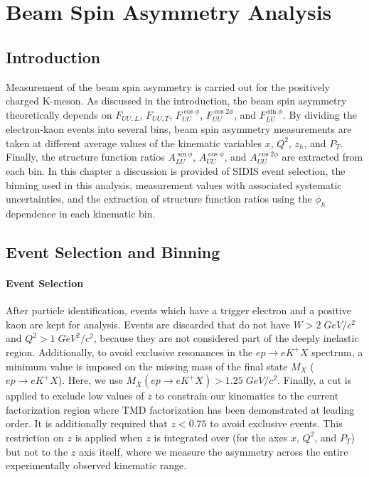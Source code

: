 \chapter{Beam Spin Asymmetry Analysis}

\section{Introduction}
Measurement of the beam spin asymmetry is carried out for the positively charged K-meson.  As discussed in the introduction, the beam spin asymmetry theoretically depends on $F_{UU,L}$, $F_{UU,T}$, $F_{UU}^{\cos\phi}$, $F_{UU}^{\cos 2\phi}$, and $F_{LU}^{\sin\phi}$.  By dividing the electron-kaon events into several bins, beam spin asymmetry measurements are taken at different average values of the kinematic variables $x$, $Q^2$, $z_h$, and $P_T$.  Finally, the structure function ratios $A_{LU}^{\sin\phi}$, $A_{UU}^{\cos\phi}$, and $A_{UU}^{\cos 2\phi}$ are extracted from each bin.  In this chapter a discussion is provided of SIDIS event selection, the binning used in this analysis, measurement values with associated systematic uncertainties, and the extraction of structure function ratios using the $\phi_h$ dependence in each kinematic bin.

\section{Event Selection and Binning}
\subsubsection*{Event Selection}
After particle identification, events which have a trigger electron and a positive kaon are kept for analysis.  Events are discarded that do not have $W > 2 \; GeV/c^2$ and $Q^2 > 1 \; GeV^2/c^2$, because they are not considered part of the deeply inelastic region.  Additionally, to avoid exclusive resonances in the $ep \rightarrow eK^+X$ spectrum, a minimum value is imposed on the missing mass of the final state $M_X$ ($ep \rightarrow eK^+X$).  Here, we use $M_{X} (ep \rightarrow eK^+X) > 1.25 \; GeV/c^2$.  Finally, a cut is applied to exclude low values of $z$ to constrain our kinematics to the current factorization region where TMD factorization has been demonstrated at leading order.  It is additionally required that $z < 0.75$ to avoid exclusive events.  This restriction on $z$ is applied when $z$ is integrated over (for the axes $x$, $Q^2$, and $P_T$) but not to the $z$ axis itself, where we measure the asymmetry across the entire experimentally observed kinematic range.  

